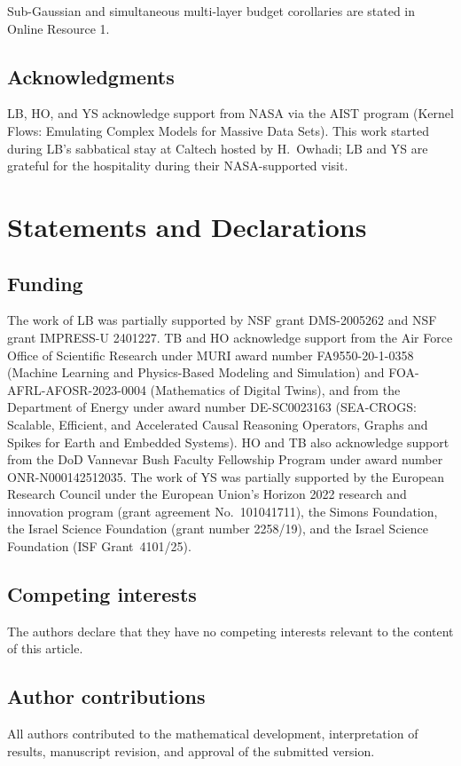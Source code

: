 \documentclass[11pt]{article}
\theoremstyle{plain}
\theoremstyle{definition}
\theoremstyle{remark}
\newcommand{\1}{\mathbf{1}}
\begin{document}
Sub-Gaussian and simultaneous multi-layer budget corollaries are stated in Online Resource 1.

\subsection*{Acknowledgments}
LB, HO, and YS acknowledge support from NASA via the AIST program (Kernel Flows: Emulating Complex Models for Massive Data Sets). This work started during LB's sabbatical stay at Caltech hosted by H.\ Owhadi; LB and YS are grateful for the hospitality during their NASA-supported visit.

\section*{Statements and Declarations}

\subsection*{Funding}
The work of LB was partially supported by NSF grant DMS-2005262 and NSF grant IMPRESS-U 2401227. TB and HO acknowledge support from the Air Force Office of Scientific Research under MURI award number FA9550-20-1-0358 (Machine Learning and Physics-Based Modeling and Simulation) and FOA-AFRL-AFOSR-2023-0004 (Mathematics of Digital Twins), and from the Department of Energy under award number DE-SC0023163 (SEA-CROGS: Scalable, Efficient, and Accelerated Causal Reasoning Operators, Graphs and Spikes for Earth and Embedded Systems). HO and TB also acknowledge support from the DoD Vannevar Bush Faculty Fellowship Program under award number ONR-N000142512035. The work of YS was partially supported by the European Research Council under the European Union's Horizon 2022 research and innovation program (grant agreement No.~101041711), the Simons Foundation, the Israel Science Foundation (grant number 2258/19), and the Israel Science Foundation (ISF Grant~4101/25).

\subsection*{Competing interests}
The authors declare that they have no competing interests relevant to the content of this article.

\subsection*{Author contributions}
All authors contributed to the mathematical development, interpretation of results, manuscript revision, and approval of the submitted version.
\end{document}
